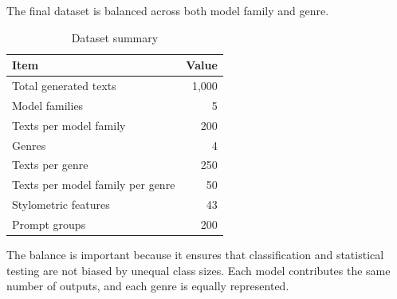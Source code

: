 The final dataset is balanced across both model family and genre.

\begin{table}[H]
\centering
\caption{Dataset summary}
\label{tab:dataset-summary}
\begin{tabular}{lr}
\toprule
Item & Value \\
\midrule
Total generated texts & 1{,}000 \\
Model families & 5 \\
Texts per model family & 200 \\
Genres & 4 \\
Texts per genre & 250 \\
Texts per model family per genre & 50 \\
Stylometric features & 43 \\
Prompt groups & 200 \\
\bottomrule
\end{tabular}
\end{table}

The balance is important because it ensures that classification and statistical testing are not biased by unequal class sizes. Each model contributes the same number of outputs, and each genre is equally represented.

